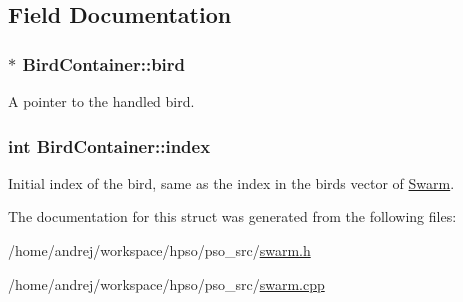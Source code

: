 \subsection{Field Documentation}
\hypertarget{structBirdContainer_e4a43aeff071ae064cdae99f95e1e56f}{
\subsubsection{$\ast$ {\bf BirdContainer::bird}}}
\label{structBirdContainer_e4a43aeff071ae064cdae99f95e1e56f}


A pointer to the handled bird. 

\hypertarget{structBirdContainer_8e53df5bbf1ff5319498507e2711da61}{
\subsubsection{\setlength{\rightskip}{0pt plus 5cm}int {\bf BirdContainer::index}}}
\label{structBirdContainer_8e53df5bbf1ff5319498507e2711da61}


Initial index of the bird, same as the index in the birds vector of \hyperlink{classSwarm}{Swarm}. 



The documentation for this struct was generated from the following files:\begin{CompactItemize}
\item 
/home/andrej/workspace/hpso/pso\_\-src/\hyperlink{swarm_8h}{swarm.h}\item 
/home/andrej/workspace/hpso/pso\_\-src/\hyperlink{swarm_8cpp}{swarm.cpp}\end{CompactItemize}
